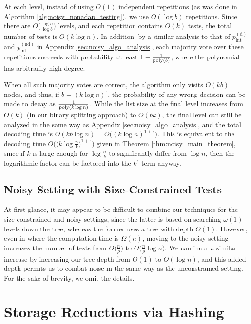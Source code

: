 At each level, instead of using $O(1)$ independent repetitions (as was done in Algorithm \ref{alg:noisy_nonadap_testing}), we use $O(\log b)$ repetitions.  Since there are $O\big( \frac{\log n}{\log b} \big)$ levels, and each repetition contains $O(k)$ tests, the total number of tests is $O(k \log n)$.   In addition, by a similar analysis to that of $p_{\text{int}}^{(\text{d})}$ and $p_{\text{int}}^{(\text{nd})}$ in Appendix \ref{sec:noisy_algo_analysis}, each majority vote over these repetitions succeeds with probability at least $1 - \frac{1}{{\rm poly}(b)}$, where the polynomial has arbitrarily high degree.

When all such majority votes are correct, the algorithm only visits $O(kb)$ nodes, and thus, if $b = (k \log n)^{\epsilon}$, the probability of any wrong decision can be made to decay as $\frac{1}{{\rm poly}(k \log n)}$.  While the list size at the final level increases from $O(k)$ (in our binary splitting approach) to $O(bk)$, the final level can still be analyzed in the same way as Appendix \ref{sec:noisy_algo_analysis}, and the total decoding time is $O(kb \log n) = O\big( (k \log n)^{1+\epsilon} )$.  This is equivalent to the decoding time $O\big( \big(k \log \frac{n}{k} \big)^{1+\epsilon} )$ given in Theorem \ref{thm:noisy_main_theorem}, since if $k$ is large enough for $\log\frac{n}{k}$ to significantly differ from $\log n$, then the logarithmic factor can be factored into the $k^{\epsilon}$ term anyway.

\subsection{Noisy Setting with Size-Constrained Tests}

At first glance, it may appear to be difficult to combine our techniques for the size-constrained and noisy settings, since the latter is based on searching $\omega(1)$ levels down the tree, whereas the former uses a tree with depth $O(1)$.  However, even in \cite{Ven19} where the computation time is $\Omega(n)$, moving to the noisy setting increases the number of tests from $O\big(\frac{n}{\rho}\big)$ to $O\big(\frac{n}{\rho} \log n\big)$.  We can incur a similar increase by increasing our tree depth from $O(1)$ to $O(\log n)$, and this added depth permits us to combat noise in the same way as the unconstrained setting.  For the sake of brevity, we omit the details.

\section{Storage Reductions via Hashing} \label{sec:storage_reductions}

